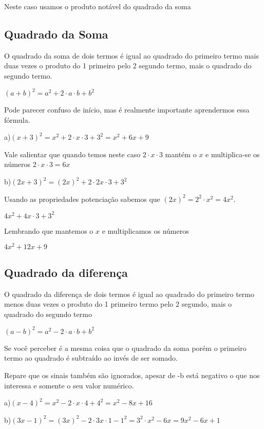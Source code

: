 \documentclass[letterpaper]{book}
\begin{document}
Neste caso usamos o produto notável do quadrado da soma

\subsection{Quadrado da Soma}

O quadrado da soma de dois termos é igual ao quadrado do primeiro termo mais duas vezes o produto do 1 primeiro pelo 2 segundo termo, mais o quadrado do segundo termo.

$(a + b)^{2} = a^{2} + 2 \cdot a \cdot b + b^{2}$ 

Pode parecer confuso de início, mas é realmente importante aprendermos essa fórmula.

a)$(x+3)^{2} = x^{2} + 2 \cdot x \cdot 3 + 3^{2} = x^{2} + 6x + 9$

Vale salientar que quando temos neste caso $2 \cdot x \cdot 3$
mantém o $x$ e multiplica-se os números $2 \cdot x \cdot 3 = 6x$

b)$(2x+3)^{2} = (2x)^{2} + 2 \cdot 2x \cdot 3 + 3^{2}$

Usando as propriedades potenciação sabemos que $(2x)^{2} = 2^{2} \cdot x^{2} = 4x^{2}$.

$4x^{2} + 4x \cdot 3 + 3^{2}$

Lembrando que mantemos o $x$ e multiplicamos os números

$4x^{2} + 12x + 9$

\subsection{Quadrado da diferença}

O quadrado da diferença de dois termos é igual ao quadrado do primeiro termo menos duas vezes o produto do 1 primeiro termo pelo 2 segundo, mais o quadrado do segundo termo

$(a - b)^{2} = a^{2} - 2 \cdot a \cdot b + b^{2}$

Se você perceber é a mesma coisa que o quadrado da soma porém o primeiro termo ao quadrado é subtraído ao invés de ser somado.

Repare que os sinais também são ignorados, apesar de -b está negativo o que nos interessa e somente o seu valor numérico.

a)$(x-4)^{2} = x^{2} - 2 \cdot x \cdot 4 + 4^{2} = x^{2} - 8x + 16$

b)\((3x - 1)^{2} = (3x)^{2} - 2 \cdot 3x \cdot 1 - 1^{2} = 3^{2} \cdot x^{2} - 6x = 9x^{2} - 6x + 1\)
\end{document}
